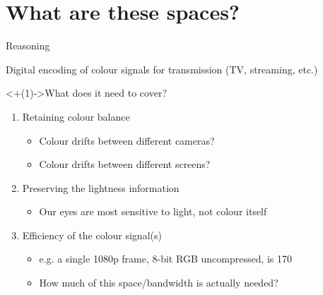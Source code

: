 \documentclass[aspectratio=169,handout,usepdftitle=false]{fireshonks}
\begin{document}
\section{What are these spaces?}
\begin{frame}{Reasoning}
    \begin{center}
        Digital encoding of colour signals for transmission (TV, streaming, etc.)
    \end{center}

    \uncover<+(1)->{What does it need to cover? \autocite{tooms}}
    \begin{enumerate}[<+(1)->]
        \item Retaining colour balance
              \begin{itemize}
                  \item Colour drifts between different cameras? 
                  \item Colour drifts between different screens? 
              \end{itemize}
        \item Preserving the lightness information
              \begin{itemize}
                  \item Our eyes are most sensitive to light, not colour itself
              \end{itemize}
        \item Efficiency of the colour signal(s)
              \begin{itemize}
                  \item e.g. a single 1080p frame, 8-bit RGB uncompressed, is \SI{170}{\mega\byte}
                  \item How much of this space/bandwidth is actually needed?
              \end{itemize}
    \end{enumerate}
\end{frame}
\end{document}
